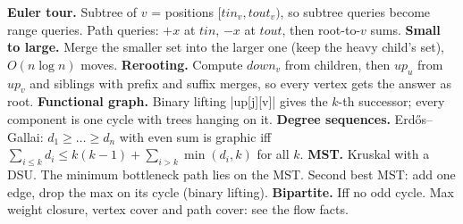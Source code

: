 {\small
\textbf{Euler tour.} Subtree of $v$ = positions $[tin_v, tout_v)$, so subtree queries become range queries. Path queries: $+x$ at $tin$, $-x$ at $tout$, then root-to-$v$ sums.
\textbf{Small to large.} Merge the smaller set into the larger one (keep the heavy child's set), $O(n \log n)$ moves.
\textbf{Rerooting.} Compute $down_v$ from children, then $up_u$ from $up_v$ and siblings with prefix and suffix merges, so every vertex gets the answer as root.
\textbf{Functional graph.} Binary lifting \code|up[j][v]| gives the $k$-th successor; every component is one cycle with trees hanging on it.
\textbf{Degree sequences.} Erd\H{o}s--Gallai: $d_1 \ge \dots \ge d_n$ with even sum is graphic iff $\sum_{i \le k} d_i \le k(k-1) + \sum_{i > k}\min(d_i, k)$ for all $k$.
\textbf{MST.} Kruskal with a DSU. The minimum bottleneck path lies on the MST. Second best MST: add one edge, drop the max on its cycle (binary lifting).
\textbf{Bipartite.} Iff no odd cycle. Max weight closure, vertex cover and path cover: see the flow facts.
\par}
